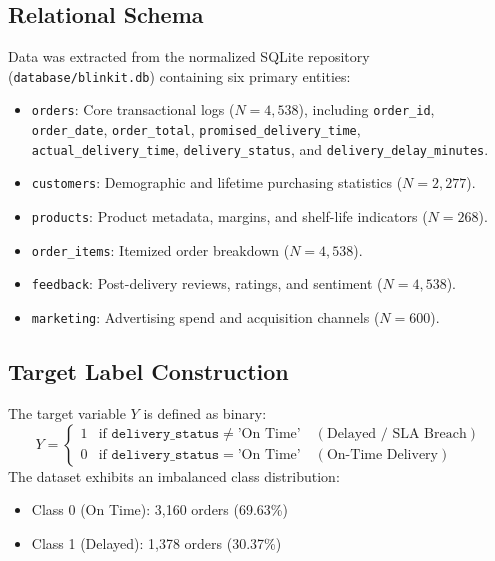 \documentclass[11pt,a4paper]{article}
\begin{document}
\subsection{Relational Schema}
Data was extracted from the normalized SQLite repository (\texttt{database/blinkit.db}) containing six primary entities:
\begin{itemize}
    \item \texttt{orders}: Core transactional logs ($N=4,538$), including \texttt{order\_id}, \texttt{order\_date}, \texttt{order\_total}, \texttt{promised\_delivery\_time}, \texttt{actual\_delivery\_time}, \texttt{delivery\_status}, and \texttt{delivery\_delay\_minutes}.
    \item \texttt{customers}: Demographic and lifetime purchasing statistics ($N=2,277$).
    \item \texttt{products}: Product metadata, margins, and shelf-life indicators ($N=268$).
    \item \texttt{order\_items}: Itemized order breakdown ($N=4,538$).
    \item \texttt{feedback}: Post-delivery reviews, ratings, and sentiment ($N=4,538$).
    \item \texttt{marketing}: Advertising spend and acquisition channels ($N=600$).
\end{itemize}

\subsection{Target Label Construction}
The target variable $Y$ is defined as binary:
\begin{equation}
    Y = \begin{cases}
        1 & \text{if } \texttt{delivery\_status} \neq \text{'On Time'} \quad (\text{Delayed / SLA Breach}) \\
        0 & \text{if } \texttt{delivery\_status} = \text{'On Time'} \quad (\text{On-Time Delivery})
    \end{cases}
\end{equation}
The dataset exhibits an imbalanced class distribution:
\begin{itemize}
    \item Class 0 (On Time): 3,160 orders (69.63\%)
    \item Class 1 (Delayed): 1,378 orders (30.37\%)
\end{itemize}

\end{document}
